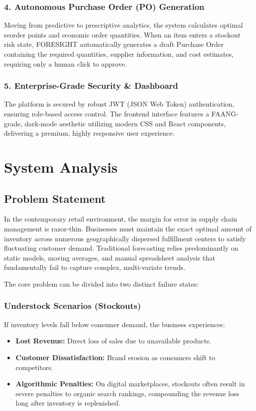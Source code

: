 \documentclass[12pt,a4paper]{report}
\begin{document}
\subsection{4. Autonomous Purchase Order (PO) Generation}
Moving from predictive to prescriptive analytics, the system calculates optimal reorder points and economic order quantities. When an item enters a stockout risk state, FORESIGHT automatically generates a draft Purchase Order containing the required quantities, supplier information, and cost estimates, requiring only a human click to approve.

\subsection{5. Enterprise-Grade Security \& Dashboard}
The platform is secured by robust JWT (JSON Web Token) authentication, ensuring role-based access control. The frontend interface features a FAANG-grade, dark-mode aesthetic utilizing modern CSS and React components, delivering a premium, highly responsive user experience.

\chapter{System Analysis}

\section{Problem Statement}
In the contemporary retail environment, the margin for error in supply chain management is razor-thin. Businesses must maintain the exact optimal amount of inventory across numerous geographically dispersed fulfillment centers to satisfy fluctuating customer demand. Traditional forecasting relies predominantly on static models, moving averages, and manual spreadsheet analysis that fundamentally fail to capture complex, multi-variate trends.

The core problem can be divided into two distinct failure states:

\subsection{Understock Scenarios (Stockouts)}
If inventory levels fall below consumer demand, the business experiences:
\begin{itemize}
    \item \textbf{Lost Revenue:} Direct loss of sales due to unavailable products.
    \item \textbf{Customer Dissatisfaction:} Brand erosion as consumers shift to competitors.
    \item \textbf{Algorithmic Penalties:} On digital marketplaces, stockouts often result in severe penalties to organic search rankings, compounding the revenue loss long after inventory is replenished.
\end{itemize}
\end{document}
